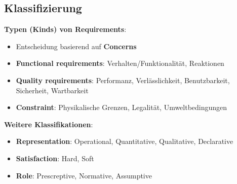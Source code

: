 \subsection{Klassifizierung}
\label{rq:sub:klassifizierung}

\textbf{Typen (Kinds) von Requirements}:
\begin{itemize}
	\item Entscheidung basierend auf \textbf{Concerns}
	\item \textbf{Functional requirements}: Verhalten/Funktionalität, Reaktionen
	\item \textbf{Quality requirements}: Performanz, Verlässlichkeit, Benutzbarkeit, Sicherheit, Wartbarkeit
	\item \textbf{Constraint}: Physikalische Grenzen, Legalität, Umweltbedingungen
\end{itemize}
\textbf{Weitere Klassifikationen}:
\begin{itemize}
	\item \textbf{Representation}: Operational, Quantitative, Qualitative, Declarative
	\item \textbf{Satisfaction}: Hard, Soft
	\item \textbf{Role}: Prescreptive, Normative, Assumptive
\end{itemize}